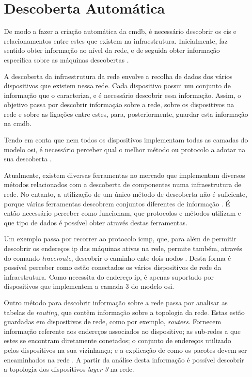 \documentclass[
  oneside,
  11pt, a4paper,
  footinclude=true,
  headinclude=true,
  cleardoublepage=empty
]{scrbook}
\begin{document}
\fontsize{11}{11}\selectfont 

\section{Descoberta Automática}

De modo a fazer a criação automática da \gls{cmdb}, é necessário descobrir os \glspl{ci} e relacionamentos entre estes que existem na infraestrutura. Inicialmente, faz sentido obter informação ao nível da rede, e de seguida obter informação específica sobre as máquinas descobertas \cite{taddm}.

A descoberta da infraestrutura da rede envolve a recolha de dados dos vários dispositivos que existem nessa rede. Cada dispositivo possui um conjunto de informação que o caracteriza, e é necessário descobrir essa informação. Assim, o objetivo passa por descobrir informação sobre a rede, sobre os dispositivos na rede e sobre as ligações entre estes, para, posteriormente, guardar esta informação na \gls{cmdb}. 


Tendo em conta que nem todos os dispositivos implementam todas as camadas do modelo \gls{osi}, é necessário perceber qual o melhor método ou protocolo a adotar na sua descoberta \cite{osimodel}.

Atualmente, existem diversas ferramentas no mercado que implementam diversos métodos relacionados com a descoberta de componentes numa infraestrutura de rede. No entanto, a utilização de um único método de descoberta não é suficiente, porque várias ferramentas descobrem conjuntos diferentes de informação \citep{taddm}. É então necessário perceber como funcionam, que protocolos e métodos utilizam e que tipo de dados é possível obter através destas ferramentas. 

Um exemplo passa por recorrer ao protocolo \gls{icmp}, que, para além de permitir descobrir os endereços \gls{ip} das máquinas ativas na rede, permite também, através do comando \textit{traceroute}, descobrir o caminho ente dois nodos \cite{bearden2013network}. Desta forma é possível perceber como estão conectados os vários dispositivos de rede da infraestrutura. Como necessita do endereço \gls{ip}, é apenas suportado por dispositivos que implementem a camada 3 do modelo \gls{osi}.

Outro método para descobrir informação sobre a rede passa por analisar as tabelas de \textit{routing}, que contêm informação sobre a topologia da rede. Estas estão guardadas em dispositivos de rede, como por exemplo, \textit{routers}. Fornecem informação referente aos endereços associados ao dispositivo; as sub-redes a que estes se encontram diretamente conetados; o conjunto de endereços utilizado pelos dispositivos na sua vizinhança; e a explicação de como os pacotes devem ser encaminhados na rede \cite{bearden2013network}. A partir da análise desta informação é possível descobrir a topologia dos dispositivos \textit{layer 3} na rede.
\end{document}
